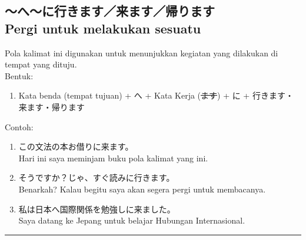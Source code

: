 \subsection*{
    ～へ～に行きます／来ます／帰ります \\
    Pergi untuk melakukan sesuatu
}
Pola kalimat ini digunakan untuk menunjukkan kegiatan yang dilakukan
di tempat yang dituju.\\
Bentuk:
\begin{enumerate}
    \item Kata benda (tempat tujuan) + へ + Kata Kerja (\sout{ます}) + に + 
    行きます・来ます・帰ります
\end{enumerate}
Contoh: 
\begin{enumerate}
    \item この文法の本お借りに来ます。
    \\ Hari ini saya meminjam buku pola kalimat yang ini.
    \item そうですか？じゃ、すぐ読みに行きます。
    \\ Benarkah? Kalau begitu saya akan segera pergi untuk membacanya.
    \item 私は日本へ国際関係を勉強しに来ました。
    \\ Saya datang ke Jepang untuk belajar Hubungan Internasional.
\end{enumerate}

\vspace{0.2cm}\hrule height 1pt\vspace{0.2cm}

\newpage

